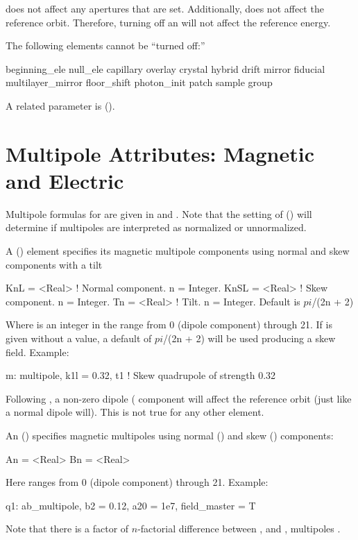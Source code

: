  does not affect any apertures that are set. Additionally,  does not affect the
reference orbit. Therefore, turning off an  will not affect the reference energy.

The following elements cannot be ``turned off:''
\begin{example}
  beginning_ele       null_ele
  capillary           overlay
  crystal             hybrid
  drift               mirror
  fiducial            multilayer_mirror
  floor_shift         photon_init
  patch               sample
  group
\end{example}

A related parameter is  ().

\section{Multipole Attributes: Magnetic and Electric}
\label{s:multip}

Multipole formulas for are given in  and . Note that the
setting of  () will determine if multipoles are interpreted as
normalized or unnormalized.

A  () element specifies its magnetic multipole components using normal
and skew components with a tilt
\begin{example}
  KnL  = <Real>  ! Normal component. n = Integer. 
  KnSL = <Real>  ! Skew component. n = Integer. 
  Tn   = <Real>  ! Tilt. n = Integer. Default is $pi$/(2n + 2)
\end{example}
Where  is an integer in the range from 0 (dipole component) through 21.  If  is given
without a value, a default of $pi$/(2n + 2) will be used producing a skew field. Example:
\begin{example}
  m: multipole, k1l = 0.32, t1  ! Skew quadrupole of strength 0.32
\end{example}
Following , a non-zero dipole ( component will affect the reference orbit (just like
a normal dipole will). This is not true for any other element.

An  () specifies magnetic multipoles
using normal () and skew () components:
\begin{example}
  An = <Real>
  Bn = <Real>
\end{example}
Here  ranges from 0 (dipole component) through 21. Example:
\begin{example}
  q1: ab_multipole, b2 = 0.12, a20 = 1e7, field_master = T
\end{example}
Note that there is a factor of $n$-factorial difference between ,  and ,
 multipoles .

